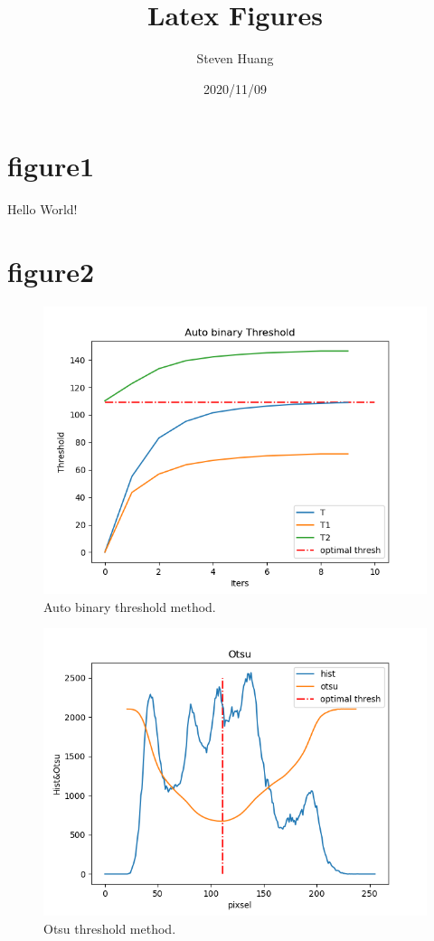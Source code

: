 \documentclass{article}
\title{ Latex Figures}
\date{2020/11/09}
\author{Steven Huang}
\begin{document}
\maketitle
\newpage
{}

\section{figure1}
Hello World!
\section{figure2}
\begin{figure}[h!]
  \includegraphics[width=\linewidth]{autoThres.png}
  \caption{Auto binary threshold method.}
  \label{fig:bin1}
\end{figure}

\begin{figure}[h!]
  \includegraphics[width=\linewidth]{otsu.png}
  \caption{Otsu threshold method.}
  \label{fig:Otsu1}
\end{figure}
\end{document}
